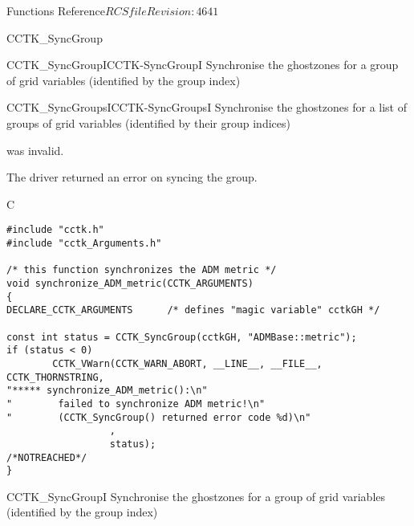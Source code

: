 \begin{cactuspart}{ Functions Reference}{$RCSfile$}{$Revision: 4641 $}
\begin{FunctionDescription}{CCTK\_SyncGroup}
\begin{SeeAlsoSection}
\begin{SeeAlso2}{CCTK\_SyncGroupI}{CCTK-SyncGroupI}
Synchronise the ghostzones for a group of grid variables
(identified by the group index)
\end{SeeAlso2}
\begin{SeeAlso2}{CCTK\_SyncGroupsI}{CCTK-SyncGroupsI}
Synchronise the ghostzones for a list of groups of grid variables
(identified by their group indices)
\end{SeeAlso2}
\end{SeeAlsoSection}

\begin{ErrorSection}
\begin{Error}{-1}
 was invalid.
\end{Error}
\begin{Error}{-2}
The driver returned an error on syncing the group.
\end{Error}
\end{ErrorSection}

\begin{ExampleSection}
\begin{Example}{C}
\begin{verbatim}
#include "cctk.h"
#include "cctk_Arguments.h"

/* this function synchronizes the ADM metric */
void synchronize_ADM_metric(CCTK_ARGUMENTS)
{
DECLARE_CCTK_ARGUMENTS      /* defines "magic variable" cctkGH */

const int status = CCTK_SyncGroup(cctkGH, "ADMBase::metric");
if (status < 0)
        CCTK_VWarn(CCTK_WARN_ABORT, __LINE__, __FILE__, CCTK_THORNSTRING,
"***** synchronize_ADM_metric():\n"
"        failed to synchronize ADM metric!\n"
"        (CCTK_SyncGroup() returned error code %d)\n"
                  ,
                  status);                                 /*NOTREACHED*/
}
\end{verbatim}
\end{Example}
\end{ExampleSection}
\end{FunctionDescription}



\begin{FunctionDescription}{CCTK\_SyncGroupI}
\label{CCTK-SyncGroupI}
Synchronise the ghostzones for a group of grid variables
(identified by the group index)


\end{FunctionDescription}
\end{cactuspart}
